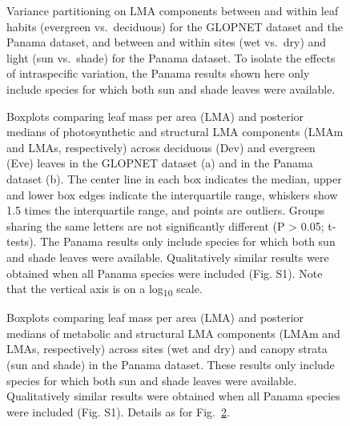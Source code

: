 \documentclass[
  12pt,
  letterpaper,
  DIV=11,
  numbers=noendperiod]{scrartcl}
\begin{document}
\newpage

\begin{figure}


\caption{\label{fig-vpart}Variance partitioning on LMA components
between and within leaf habits (evergreen vs.~deciduous) for the GLOPNET
dataset and the Panama dataset, and between and within sites (wet
vs.~dry) and light (sun vs.~shade) for the Panama dataset. To isolate
the effects of intraspecific variation, the Panama results shown here
only include species for which both sun and shade leaves were
available.}

\end{figure}%

\newpage

\begin{figure}


\caption{\label{fig-box_de}Boxplots comparing leaf mass per area (LMA)
and posterior medians of photosynthetic and structural LMA components
(LMAm and LMAs, respectively) across deciduous (Dev) and evergreen (Eve)
leaves in the GLOPNET dataset (a) and in the Panama dataset (b). The
center line in each box indicates the median, upper and lower box edges
indicate the interquartile range, whiskers show 1.5 times the
interquartile range, and points are outliers. Groups sharing the same
letters are not significantly different (P \textgreater{} 0.05;
t-tests). The Panama results only include species for which both sun and
shade leaves were available. Qualitatively similar results were obtained
when all Panama species were included (Fig. S1). Note that the vertical
axis is on a log\textsubscript{10} scale.}

\end{figure}%

\newpage

\begin{figure}


\caption{\label{fig-box_pa}Boxplots comparing leaf mass per area (LMA)
and posterior medians of metabolic and structural LMA components (LMAm
and LMAs, respectively) across sites (wet and dry) and canopy strata
(sun and shade) in the Panama dataset. These results only include
species for which both sun and shade leaves were available.
Qualitatively similar results were obtained when all Panama species were
included (Fig. S1). Details as for Fig.~\ref{fig-box_de}.}

\end{figure}%
\end{document}
